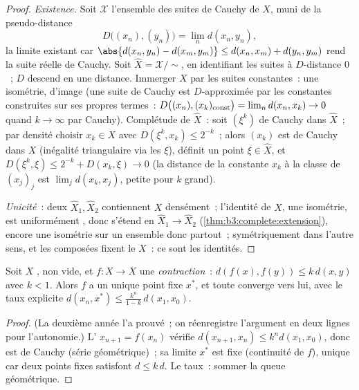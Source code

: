 \begin{proof}
\emph{Existence.} Soit $\mathcal X$ l'ensemble des suites de
Cauchy de $X$, muni de la pseudo-distance
\[
D\bigl((x_n), (y_n)\bigr) = \lim_n d(x_n, y_n),
\]
la limite existant car $\abs{d(x_n, y_n) - d(x_m, y_m)}
\leq d(x_n, x_m) + d(y_n, y_m)$ rend la suite réelle de
Cauchy. Soit $\hat X = \mathcal X/{\sim}$, en identifiant les
suites à $D$-distance $0$~; $D$ descend en une distance.
Immerger $X$ par les suites constantes~: une isométrie, d'image
 (une suite de Cauchy est $D$-approximée par les
constantes construites sur ses propres termes~:
$D\bigl((x_n), (x_k)_{\rm const}\bigr) = \lim_n d(x_n, x_k)
\to 0$ quand $k \to \infty$ par Cauchy). Complétude de $\hat
X$~: soit $(\xi^k)$ de Cauchy dans $\hat X$~; par densité
choisir $x_k \in X$ avec $D(\xi^k, x_k) \leq 2^{-k}$~; alors
$(x_k)$ est de Cauchy dans $X$ (inégalité triangulaire via les
$\xi$), définit un point $\xi \in \hat X$, et $D(\xi^k, \xi)
\leq 2^{-k} + D(x_k, \xi) \to 0$ (la distance de la constante
$x_k$ à la classe de $(x_j)_j$ est $\lim_j d(x_k, x_j)$, petite
pour $k$ grand).

\emph{Unicité}~: deux  $\hat X_1, \hat X_2$
contiennent $X$ densément~; l'identité de $X$, une isométrie,
est uniformément , donc s'étend en $\hat X_1 \to \hat
X_2$ (\cref{thm:b3:complete:extension}), encore une isométrie
sur un ensemble  donc partout~; symétriquement dans
l'autre sens, et les composées fixent le  $X$~: ce sont
les identités.
\end{proof}

\begin{theorem}\label{thm:b3:complete:banach}
Soit $X$ , non vide, et $f \colon X \to X$ une
\emph{contraction}~: $d(f(x), f(y)) \leq k\,d(x,y)$ avec $k <
1$. Alors $f$ a un unique point fixe $x^*$, et toute 
converge vers lui, avec le taux explicite $d(x_n, x^*) \leq
\frac{k^n}{1-k}\,d(x_1, x_0)$.
\end{theorem}

\begin{proof}
(La deuxième année l'a prouvé~; on réenregistre l'argument en
deux lignes pour l'autonomie.) L' $x_{n+1} = f(x_n)$
vérifie $d(x_{n+1}, x_n) \leq k^nd(x_1, x_0)$, donc est de
Cauchy (série géométrique)~; sa limite $x^*$ est fixe
(continuité de $f$), unique car deux points fixes satisfont $d
\leq k\,d$. Le taux~: sommer la queue géométrique.
\end{proof}

